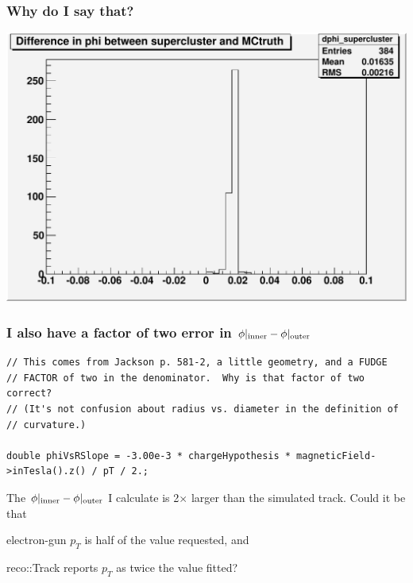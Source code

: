 \documentclass[12pt,compress]{beamer}
\begin{document}
\begin{frame}
\frametitle{Why do I say that?}
\begin{center}
\includegraphics[width=0.8\linewidth]{dphi_supercluster}
\end{center}
\end{frame}

\begin{frame}[fragile]
\begin{minipage}{\linewidth}
\frametitle{I also have a factor of two error in $\phi|_{\mbox{\scriptsize inner}} - \phi|_{\mbox{\scriptsize outer}}$}
\tiny
\begin{verbatim}
// This comes from Jackson p. 581-2, a little geometry, and a FUDGE
// FACTOR of two in the denominator.  Why is that factor of two correct?
// (It's not confusion about radius vs. diameter in the definition of
// curvature.)

double phiVsRSlope = -3.00e-3 * chargeHypothesis * magneticField->inTesla().z() / pT / 2.;
\end{verbatim}
\end{minipage}

\vfill
The $\phi|_{\mbox{\scriptsize inner}} - \phi|_{\mbox{\scriptsize
outer}}$ I calculate is 2$\times$ larger than the simulated track.
Could it be that

\vspace{0.25 cm}
\begin{list}{) }
{}
\item electron-gun $p_T$ is half of the value requested, and
\item reco::Track reports $p_T$ as twice the value fitted?
\end{list}
\end{frame}
\end{document}
